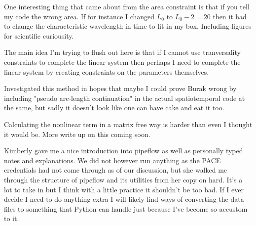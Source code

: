 \begin{description}
{\begin{description}
One interesting thing that came about from the area constraint is
that if you tell my code the wrong area. If for instance I changed
$L_0$ to $L_0 - 2 = 20$ then it had to change the characteristic
wavelength in time to fit in my box. Including figures for scientific
curiousity.

The main idea I'm trying to flush out here is that if I cannot use
tranversality constraints to complete the linear system then
perhaps I need to complete the linear system by creating constraints
on the parameters themselves.

\item[pseudo arc-length constraint]
Investigated this method in hopes that maybe I could prove Burak wrong
by including "pseudo arc-length continuation" in the actual spatiotemporal
code at the same, but sadly it doesn't look like one can have cake and eat
it too.

\item[matrix free adjoint descent]
Calculating the nonlinear term in a matrix free way is harder than even I thought
it would be. More write up on this coming soon.

\item[pipeflow]
Kimberly gave me a nice introduction into pipeflow as well as personally
typed notes and explanations. We did not however run anything as the
PACE credentials had not come through as of our discussion, but she
walked me through the structure of pipeflow and its utilities from
her copy on hard. It's a lot to take in but I think with a little
practice it shouldn't be too bad. If I ever decide I need to do
anything extra I will likely find ways of converting the data files
to something that Python can handle just because I've become so accustom
to it.
\end{description}
}



\end{description}
